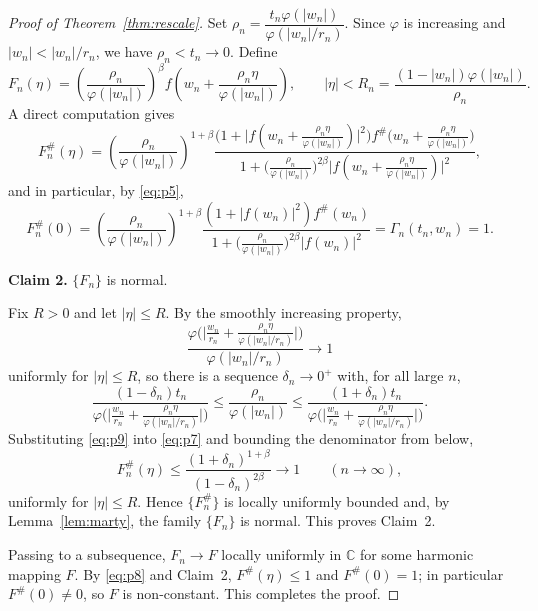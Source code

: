 \documentclass[10pt,a4paper]{amsart}
\newcommand{\C}{\mathbb{C}}
\begin{document}
\begin{proof}[Proof of Theorem~\textup{\ref{thm:rescale}}]
Set $\rho_{n}=\dfrac{t_{n}\varphi(|w_{n}|)}{\varphi(|w_{n}|/r_{n})}$. Since $\varphi$ is
increasing and $|w_{n}|<|w_{n}|/r_{n}$, we have $\rho_{n}<t_{n}\to0$. Define
\[
F_{n}(\eta)=\left(\frac{\rho_{n}}{\varphi(|w_{n}|)}\right)^{\beta}
f\!\left(w_{n}+\frac{\rho_{n}\eta}{\varphi(|w_{n}|)}\right),
\qquad |\eta|<R_{n}=\frac{(1-|w_{n}|)\varphi(|w_{n}|)}{\rho_{n}}.
\]
A direct computation gives
\begin{equation}\label{eq:p7}
F_{n}^{\#}(\eta)=\left(\frac{\rho_{n}}{\varphi(|w_{n}|)}\right)^{1+\beta}
\frac{\Big(1+\big|f(w_{n}+\tfrac{\rho_{n}\eta}{\varphi(|w_{n}|)})\big|^{2}\Big)
f^{\#}\!\big(w_{n}+\tfrac{\rho_{n}\eta}{\varphi(|w_{n}|)}\big)}
{1+\big(\tfrac{\rho_{n}}{\varphi(|w_{n}|)}\big)^{2\beta}
\big|f(w_{n}+\tfrac{\rho_{n}\eta}{\varphi(|w_{n}|)})\big|^{2}},
\end{equation}
and in particular, by \eqref{eq:p5},
\begin{equation}\label{eq:p8}
F_{n}^{\#}(0)=\left(\frac{\rho_{n}}{\varphi(|w_{n}|)}\right)^{1+\beta}
\frac{(1+|f(w_{n})|^{2})f^{\#}(w_{n})}
{1+\big(\tfrac{\rho_{n}}{\varphi(|w_{n}|)}\big)^{2\beta}|f(w_{n})|^{2}}
=\Gamma_{n}(t_{n},w_{n})=1.
\end{equation}

\smallskip
\noindent\textbf{Claim 2.} $\{F_{n}\}$ is normal.

\smallskip
Fix $R>0$ and let $|\eta|\le R$. By the smoothly increasing property,
\[
\frac{\varphi\!\Big(\big|\tfrac{w_{n}}{r_{n}}+\tfrac{\rho_{n}\eta}
{\varphi(|w_{n}|/r_{n})}\big|\Big)}{\varphi(|w_{n}|/r_{n})}\longrightarrow1
\]
uniformly for $|\eta|\le R$, so there is a sequence $\delta_{n}\to0^{+}$ with, for all large
$n$,
\begin{equation}\label{eq:p9}
\frac{(1-\delta_{n})t_{n}}
{\varphi\!\big(\big|\tfrac{w_{n}}{r_{n}}+\tfrac{\rho_{n}\eta}{\varphi(|w_{n}|/r_{n})}\big|\big)}
\le\frac{\rho_{n}}{\varphi(|w_{n}|)}
\le\frac{(1+\delta_{n})t_{n}}
{\varphi\!\big(\big|\tfrac{w_{n}}{r_{n}}+\tfrac{\rho_{n}\eta}{\varphi(|w_{n}|/r_{n})}\big|\big)}.
\end{equation}
Substituting \eqref{eq:p9} into \eqref{eq:p7} and bounding the denominator from below,
\[
F_{n}^{\#}(\eta)\le\frac{(1+\delta_{n})^{1+\beta}}{(1-\delta_{n})^{2\beta}}
\longrightarrow1\qquad(n\to\infty),
\]
uniformly for $|\eta|\le R$. Hence $\{F_{n}^{\#}\}$ is locally uniformly bounded and, by
Lemma~\ref{lem:marty}, the family $\{F_{n}\}$ is normal. This proves Claim~2.

\smallskip
Passing to a subsequence, $F_{n}\to F$ locally uniformly in $\C$ for some harmonic mapping
$F$. By \eqref{eq:p8} and Claim~2, $F^{\#}(\eta)\le1$ and $F^{\#}(0)=1$; in particular
$F^{\#}(0)\neq0$, so $F$ is non-constant. This completes the proof.
\end{proof}
\end{document}
